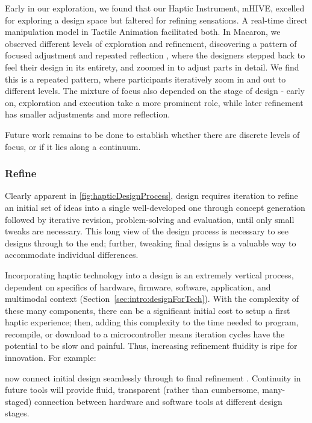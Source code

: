 Early in our exploration, we found that our Haptic Instrument, mHIVE, excelled for exploring a design space but faltered for refining sensations.
A real-time direct manipulation model in Tactile Animation facilitated both.
In Macaron, we observed different levels of exploration and refinement, discovering a pattern of focused adjustment and repeated reflection \cite{Schon1982}, where the designers stepped back to feel their design in its entirety, and zoomed in to adjust parts in detail.
We find this is a repeated pattern, where participants iteratively zoom in and out to different levels.
The mixture of focus also depended on the stage of design - early on, exploration and execution take a more prominent role, while later refinement has smaller adjustments and more reflection.

Future work remains to be done to establish whether there are discrete levels of focus, or if it lies along a continuum.



%
%
\subsubsection{Refine}
	\label{sec:make_DP_refine}
Clearly apparent in \autoref{fig:hapticDesignProcess}, design requires iteration to refine an initial set of ideas into a single well-developed one through concept generation followed by iterative revision, problem-solving and  evaluation, until only small tweaks are necessary.
This long view of the design process is necessary to see designs through to the end;
further, tweaking final designs is a valuable way to accommodate individual differences.

Incorporating haptic technology into a design is an extremely vertical process,  dependent on  specifics of hardware, firmware, software, application, and multimodal context (Section~\ref{sec:intro:designForTech}).
With the complexity of these many components, there can be a significant initial cost to setup a first haptic experience; then, adding this complexity to the time needed to program, recompile, or download to a microcontroller means iteration cycles have the potential to be slow and painful. 
%
Thus, increasing refinement fluidity is ripe for innovation. For example:

 now connect initial design seamlessly through to final refinement \cite{schneider2015tactile,Schneider2016macaron}.
Continuity in future tools will provide fluid, transparent (rather than cumbersome, many-staged) connection between hardware and software tools at different design stages.

